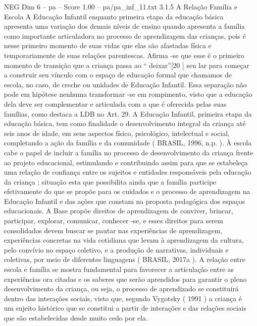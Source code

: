 \begin{textsample}{NEG Dim 6 – pa – Score 1.00 – pa/pa\_inf\_11.txt}  \label{ex:f6_neg_224}
3.1.5 A Relação Família e Escola A Educação Infantil enquanto primeira etapa da educação básica apresenta uma variação dos demais níveis de ensino quando apresenta a família como importante articuladora no processo de aprendizagem das crianças, pois é nesse primeiro momento de suas vidas que elas são afastadas física e temporariamente de suas relações parentescas.
Afirma -se que esse é o primeiro momento de transição que a criança passa ao “ deixar”[20 ] seu lar para começar a construir seu vínculo com o espaço de educação formal que chamamos de escola, no caso, de creche ou unidades de Educação Infantil.
Essa separação não pode em hipótese nenhuma transformar -se em rompimento, visto que a educação dela deve ser complementar e articulada com a que é oferecida pelas suas famílias, como destaca a LDB no Art. 29.
A Educação Infantil, primeira etapa da educação básica, tem como finalidade o desenvolvimento integral da criança até seis anos de idade, em seus aspectos físico, psicológico, intelectual e social, completando a ação da família e da comunidade ( BRASIL, 1996, n.p. ).
À escola cabe o papel de incluir a família no processo de desenvolvimento da criança frente ao projeto educacional, estimulando e contribuindo assim para que se estabeleça uma relação de confiança entre os sujeitos e entidades responsáveis pela educação da criança ; situação esta que possibilita ainda que a família participe efetivamente do que se propõe para os cuidados e o processo de aprendizagem na Educação Infantil e das ações que constam na proposta pedagógica dos espaços educacionais.
A Base propõe direitos de aprendizagem de conviver, brincar, participar, explorar, comunicar, conhecer -se, e esses direitos para serem consolidados devem buscar se pautar nas experiências de aprendizagem, experiências concretas na vida cotidiana que levam à aprendizagem da cultura, pelo convívio no espaço coletivo, e a produção de narrativas, individuais e coletivas, por meio de diferentes linguagens ( BRASIL, 2017a ).
A relação entre escola e família se mostra fundamental para favorecer a articulação entre as experiências ora citadas e os saberes que serão aprendidos para garantir o pleno desenvolvimento da criança, ou seja, o processo de aprendizado se constituirá dentro das interações sociais, visto que, segundo Vygotsky ( 1991 ) a criança é um sujeito histórico que se constitui a partir de interações e das relações sociais que são estabelecidas desde muito cedo por ela.

\end{textsample}
